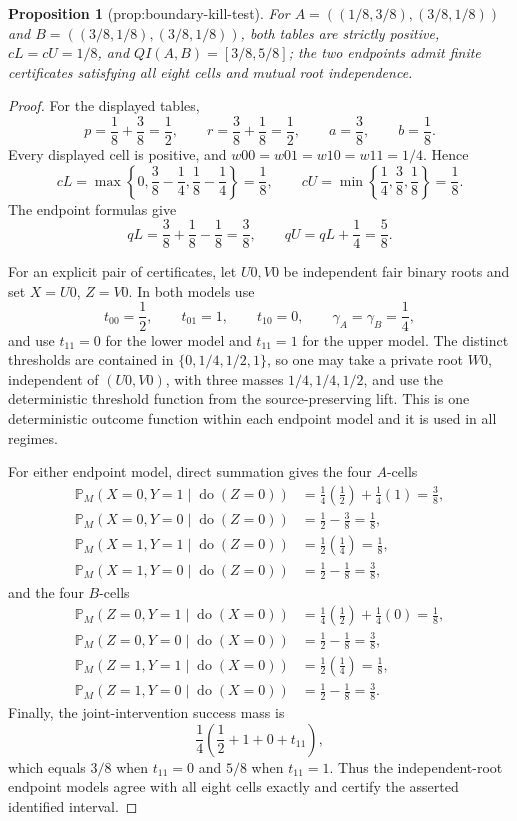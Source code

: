 \documentclass{article}
\newtheorem{proposition}{Proposition}
\begin{document}
\begin{proposition}[prop:boundary-kill-test]\label{prop:boundary-kill-test}
For \(A=((1/8,3/8),(3/8,1/8))\) and \(B=((3/8,1/8),(3/8,1/8))\), both tables are strictly positive, \(cL=cU=1/8\), and \(QI(A,B)=[3/8,5/8]\); the two endpoints admit finite certificates satisfying all eight cells and mutual root independence.
\end{proposition}
\begin{proof}
For the displayed tables,
\[
p=\frac18+\frac38=\frac12,
\qquad
r=\frac38+\frac18=\frac12,
\qquad
a=\frac38,
\qquad
b=\frac18.
\]
Every displayed cell is positive, and \(w00=w01=w10=w11=1/4\).  Hence
\[
cL=\max\left\{0,\frac38-\frac14,\frac18-\frac14\right\}=\frac18,
\qquad
cU=\min\left\{\frac14,\frac38,\frac18\right\}=\frac18.
\]
The endpoint formulas give
\[
qL=\frac38+\frac18-\frac18=\frac38,
\qquad
qU=qL+\frac14=\frac58.
\]

For an explicit pair of certificates, let \(U0,V0\) be independent fair binary roots and set \(X=U0\), \(Z=V0\).  In both models use
\[
t_{00}=\frac12,\qquad t_{01}=1,\qquad t_{10}=0,\qquad
\gamma_A=\gamma_B=\frac14,
\]
and use \(t_{11}=0\) for the lower model and \(t_{11}=1\) for the upper model.  The distinct thresholds are contained in \(\{0,1/4,1/2,1\}\), so one may take a private root \(W0\), independent of \((U0,V0)\), with three masses \(1/4,1/4,1/2\), and use the deterministic threshold function from the source-preserving lift.  This is one deterministic outcome function within each endpoint model and it is used in all regimes.

For either endpoint model, direct summation gives the four \(A\)-cells
\[
\begin{aligned}
\mathbb P_M(X=0,Y=1\mid\operatorname{do}(Z=0))&=\tfrac14(\tfrac12)+\tfrac14(1)=\tfrac38,\\
\mathbb P_M(X=0,Y=0\mid\operatorname{do}(Z=0))&=\tfrac12-\tfrac38=\tfrac18,\\
\mathbb P_M(X=1,Y=1\mid\operatorname{do}(Z=0))&=\tfrac12(\tfrac14)=\tfrac18,\\
\mathbb P_M(X=1,Y=0\mid\operatorname{do}(Z=0))&=\tfrac12-\tfrac18=\tfrac38,
\end{aligned}
\]
and the four \(B\)-cells
\[
\begin{aligned}
\mathbb P_M(Z=0,Y=1\mid\operatorname{do}(X=0))&=\tfrac14(\tfrac12)+\tfrac14(0)=\tfrac18,\\
\mathbb P_M(Z=0,Y=0\mid\operatorname{do}(X=0))&=\tfrac12-\tfrac18=\tfrac38,\\
\mathbb P_M(Z=1,Y=1\mid\operatorname{do}(X=0))&=\tfrac12(\tfrac14)=\tfrac18,\\
\mathbb P_M(Z=1,Y=0\mid\operatorname{do}(X=0))&=\tfrac12-\tfrac18=\tfrac38.
\end{aligned}
\]
Finally, the joint-intervention success mass is
\[
\frac14\left(\frac12+1+0+t_{11}\right),
\]
which equals \(3/8\) when \(t_{11}=0\) and \(5/8\) when \(t_{11}=1\).  Thus the independent-root endpoint models agree with all eight cells exactly and certify the asserted identified interval.
\end{proof}
\end{document}
